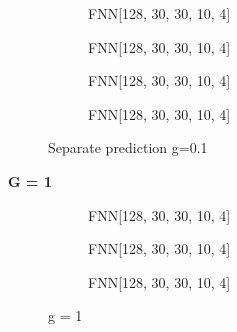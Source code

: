 \documentclass[a4paper,times,12pt]{article}
\begin{document}
\begin{figure}[H]
    \centering
    \begin{subfigure}[t]{0.45\textwidth}
		\centering
        
        \caption{FNN[128, 30, 30, 10, 4]}
		\label{fig:a}
    \end{subfigure}\hfill
    \begin{subfigure}[t]{0.45\textwidth}
		\centering
        
        \caption{FNN[128, 30, 30, 10, 4]}
		\label{fig:b}
    \end{subfigure}\hfill    
    \begin{subfigure}[t]{0.45\textwidth}
        \centering
        
        \caption{FNN[128, 30, 30, 10, 4]}
		\label{fig:c}
    \end{subfigure}\hfill
    \begin{subfigure}[t]{0.45\textwidth}
        \centering
        
        \caption{FNN[128, 30, 30, 10, 4]}
		\label{fig:c}
    \end{subfigure}
	\caption{Separate prediction  g=0.1}
\end{figure}

\textbf{G = 1}

\begin{figure}[H]
    \centering
    \begin{subfigure}[t]{0.45\textwidth}
		\centering
        
        \caption{FNN[128, 30, 30, 10, 4]}
		\label{fig:a}
    \end{subfigure}\hfill
    \begin{subfigure}[t]{0.45\textwidth}
		\centering
        
        \caption{FNN[128, 30, 30, 10, 4]}
		\label{fig:b}
    \end{subfigure}\hfill    
    \begin{subfigure}[t]{0.45\textwidth}
        \centering
        
        \caption{FNN[128, 30, 30, 10, 4]}
		\label{fig:c}
    \end{subfigure}
	\caption{g = 1}
\end{figure}
\end{document}
